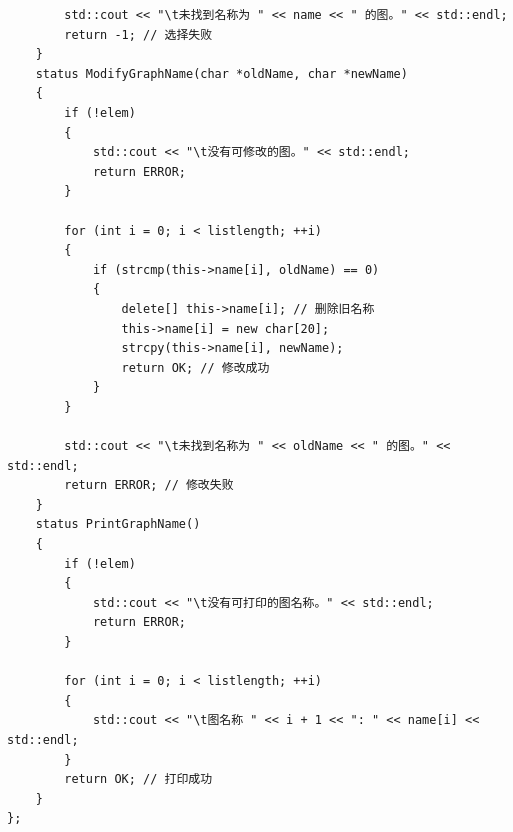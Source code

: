\documentclass[supercite]{Experimental_Report}
\theoremstyle{definition}
\begin{document}
\begin{lstlisting}
        std::cout << "\t未找到名称为 " << name << " 的图。" << std::endl;
        return -1; // 选择失败
    }
    status ModifyGraphName(char *oldName, char *newName)
    {
        if (!elem)
        {
            std::cout << "\t没有可修改的图。" << std::endl;
            return ERROR;
        }

        for (int i = 0; i < listlength; ++i)
        {
            if (strcmp(this->name[i], oldName) == 0)
            {
                delete[] this->name[i]; // 删除旧名称
                this->name[i] = new char[20];
                strcpy(this->name[i], newName);
                return OK; // 修改成功
            }
        }

        std::cout << "\t未找到名称为 " << oldName << " 的图。" << std::endl;
        return ERROR; // 修改失败
    }
    status PrintGraphName()
    {
        if (!elem)
        {
            std::cout << "\t没有可打印的图名称。" << std::endl;
            return ERROR;
        }

        for (int i = 0; i < listlength; ++i)
        {
            std::cout << "\t图名称 " << i + 1 << ": " << name[i] << std::endl;
        }
        return OK; // 打印成功
    }
};
\end{lstlisting}
\newpage
\end{document}
